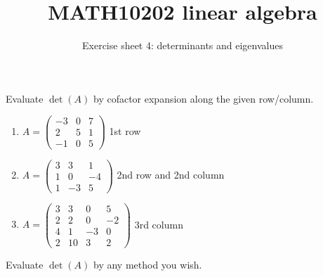 \documentclass[english,12pt,a4paper]{scrartcl}
\title{MATH10202 linear algebra}
\subtitle{Exercise sheet 4: determinants and eigenvalues}
\author{}
\date{\vspace{-5ex}}
\newenvironment{modenumerate}
  {\enumerate\setupmodenumerate}
  {\endenumerate}
\newif\ifmoditem
\newcommand{\setupmodenumerate}{%
  \global\moditemfalse
  \let\origmakelabel\makelabel
  \def\moditem##1{\global\moditemtrue\def\mesymbol{##1}\item}%
  \def\makelabel##1{%
  \origmakelabel{##1\ifmoditem\rlap{\mesymbol}\fi\enspace}%
\global\moditemfalse}%
}
\begin{document}
\maketitle

\begin{modenumerate}
  \moditem{*} Evaluate $\det(A)$ by cofactor expansion along the given 
  row/column.
    \begin{enumerate}
      \item $A =
        \begin{pmatrix}
          -3 & 0 & 7 \\
          2 & 5 & 1 \\
          -1 & 0 & 5
        \end{pmatrix}
        $ 1st row
      \item $A =
        \begin{pmatrix}
          3 & 3 & 1 \\
          1 & 0 & -4 \\
          1 & -3 & 5
        \end{pmatrix}
        $ 2nd row and 2nd column
      \item $A =
        \begin{pmatrix}
          3 & 3 & 0 & 5 \\
          2 & 2 & 0 & -2 \\
          4 & 1 & -3 & 0 \\
          2 & 10 & 3 & 2
        \end{pmatrix}
        $ 3rd column
    \end{enumerate}
  \moditem{*} Evaluate $\det(A)$ by any method you wish.
    \begin{multicols}{2}[\setlength{\columnseprule}{0pt}]
\end{multicols}
\end{modenumerate}
\end{document}
